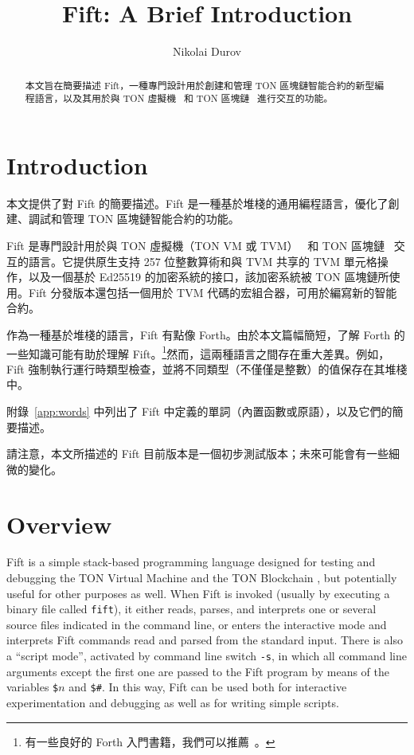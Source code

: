 \documentclass[12pt,oneside]{article}
\title{Fift: A Brief Introduction}
\author{Nikolai Durov}
\def\markbothsame#1{\fancyhead[C]{#1}}
\def\mysection#1{\section{#1}\fancyhead[C]{\textsc{Chapter \textbf{\thesection.} #1}}}
\begin{document}
\maketitle

\begin{abstract}
本文旨在簡要描述 Fift，一種專門設計用於創建和管理 TON 區塊鏈智能合約的新型編程語言，以及其用於與 TON 虛擬機~\cite{TVM} 和 TON 區塊鏈~\cite{TBC} 進行交互的功能。
\end{abstract}

\section*{Introduction}
\markbothsame{Introduction}

本文提供了對 Fift 的簡要描述。Fift 是一種基於堆棧的通用編程語言，優化了創建、調試和管理 TON 區塊鏈智能合約的功能。

Fift 是專門設計用於與 TON 虛擬機（TON VM 或 TVM）~\cite{TVM} 和 TON 區塊鏈~\cite{TBC} 交互的語言。它提供原生支持 257 位整數算術和與 TVM 共享的 TVM 單元格操作，以及一個基於 Ed25519 的加密系統的接口，該加密系統被 TON 區塊鏈所使用。Fift 分發版本還包括一個用於 TVM 代碼的宏組合器，可用於編寫新的智能合約。

作為一種基於堆棧的語言，Fift 有點像 Forth。由於本文篇幅簡短，了解 Forth 的一些知識可能有助於理解 Fift。\footnote{有一些良好的 Forth 入門書籍，我們可以推薦~\cite{Brodie}。}然而，這兩種語言之間存在重大差異。例如，Fift 強制執行運行時類型檢查，並將不同類型（不僅僅是整數）的值保存在其堆棧中。

附錄~\ref{app:words} 中列出了 Fift 中定義的單詞（內置函數或原語），以及它們的簡要描述。

請注意，本文所描述的 Fift 目前版本是一個初步測試版本；未來可能會有一些細微的變化。

\clearpage
\tableofcontents

\clearpage
\mysection{Overview}\label{sect:overview}

Fift is a simple stack-based programming language designed for testing and debugging the TON Virtual Machine \cite{TVM} and the TON Blockchain \cite{TBC}, but potentially useful for other purposes as well. When Fift is invoked (usually by executing a binary file called {\tt fift}), it either reads, parses, and interprets one or several source files indicated in the command line, or enters the interactive mode and interprets Fift commands read and parsed from the standard input. There is also a ``script mode'', activated by command line switch {\tt -s}, in which all command line arguments except the first one are passed to the Fift program by means of the variables {\tt \$$n$} and {\tt \$\#}. In this way, Fift can be used both for interactive experimentation and debugging as well as for writing simple scripts.
\end{document}
